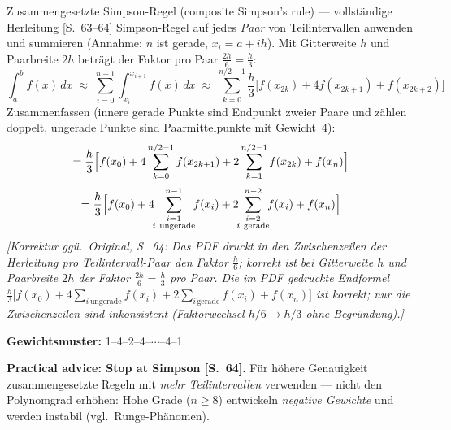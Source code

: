 \begin{satzbox}{Zusammengesetzte Simpson-Regel (composite Simpson's rule) --- vollständige Herleitung [S.~63--64]}
Simpson-Regel auf jedes \emph{Paar} von Teilintervallen anwenden und summieren
(Annahme: $n$ ist gerade, $x_i = a + ih$). Mit Gitterweite $h$ und Paarbreite $2h$
beträgt der Faktor pro Paar $\frac{2h}{6} = \frac{h}{3}$:
\[
  \int_a^b f(x)\,dx \;\approx\; \sum_{i=0}^{n-1}\int_{x_i}^{x_{i+1}} f(x)\,dx
  \;\approx\; \sum_{k=0}^{n/2-1} \frac{h}{3}\bigl[f(x_{2k}) + 4f(x_{2k+1}) + f(x_{2k+2})\bigr]
\]
Zusammenfassen (innere gerade Punkte sind Endpunkt zweier Paare und zählen doppelt,
ungerade Punkte sind Paarmittelpunkte mit Gewicht~4):
\[
  = \frac{h}{3}\Bigl[f(x_0) + 4\sum_{k=0}^{n/2-1} f(x_{2k+1})
    + 2\sum_{k=1}^{n/2-1} f(x_{2k}) + f(x_n)\Bigr]
\]
\[
  = \frac{h}{3}\Bigl[f(x_0)
    + 4\!\!\sum_{\substack{i=1 \\ i\ \text{ungerade}}}^{n-1}\!\! f(x_i)
    + 2\!\!\sum_{\substack{i=2 \\ i\ \text{gerade}}}^{n-2}\!\! f(x_i)
    + f(x_n)\Bigr]
\]
\emph{[Korrektur ggü.\ Original, S.~64: Das PDF druckt in den Zwischenzeilen der
Herleitung pro Teilintervall-Paar den Faktor $\frac{h}{6}$; korrekt ist bei
Gitterweite $h$ und Paarbreite $2h$ der Faktor $\frac{2h}{6} = \frac{h}{3}$ pro Paar.
Die im PDF gedruckte Endformel
$\frac{h}{3}\bigl[f(x_0) + 4\sum_{i\,\text{ungerade}} f(x_i)
+ 2\sum_{i\,\text{gerade}} f(x_i) + f(x_n)\bigr]$ ist korrekt; nur die Zwischenzeilen
sind inkonsistent (Faktorwechsel $h/6 \to h/3$ ohne Begründung).]}

\medskip
\textbf{Gewichtsmuster:} 1--4--2--4--$\cdots$--4--1.

\medskip
\textbf{Practical advice: Stop at Simpson [S.~64].} Für höhere Genauigkeit
zusammengesetzte Regeln mit \emph{mehr Teilintervallen} verwenden --- nicht den
Polynomgrad erhöhen: Hohe Grade ($n \ge 8$) entwickeln \emph{negative Gewichte} und
werden instabil (vgl.\ Runge-Phänomen).
\end{satzbox}

